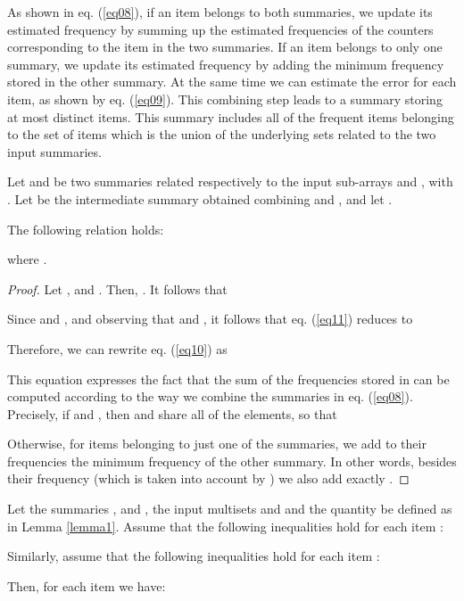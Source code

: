 \documentclass[final,3p,times]{elsarticle}
\newcommand\noi{\noindent}
\begin{document}
As shown in eq. (\ref{eq08}), if an item belongs to both summaries, we update its estimated frequency by summing up the estimated frequencies of the counters corresponding to the item in the two summaries. If an item belongs to only one summary, we update its estimated frequency by adding the minimum frequency stored in the other summary. At the same time we can estimate the error for each item, as shown by eq. (\ref{eq09}). This combining step leads to a summary  storing at most  distinct items. This summary includes all of the frequent items belonging to the set of items which is the union of the underlying sets related to the two input summaries.



\begin{lem}
\label{lemma1}
Let  and  be two summaries related respectively to the input sub-arrays  and , with . Let  be the intermediate summary obtained combining  and , and let .





\noi The following relation holds:


\end{lem} 

\noi where .

\begin{proof}
Let ,  and  . Then, . It follows that 



\noi Since  and , and observing that  and , it follows that eq. (\ref{eq11}) reduces to



\noi Therefore, we can rewrite eq. (\ref{eq10}) as



\noi This equation expresses the fact that the sum of the frequencies stored in  can be computed according to the way we combine the summaries in eq. (\ref{eq08}). Precisely, if  and , then  and  share all of the elements, so that



\noi Otherwise, for items belonging to just one of the summaries, we add to their frequencies the minimum frequency of the other summary. In other words, besides their frequency (which is taken into account by ) we also add exactly .

\end{proof}





\begin{lem}
\label{lemma2}
Let the summaries ,  and , the input multisets  and  and the quantity  be defined as in Lemma \ref{lemma1}. Assume that the following inequalities hold for each item : 






\noi Similarly, assume that the following inequalities hold for each item : 





\noi Then, for each item  we have:




 
\end{lem}
\end{document}
